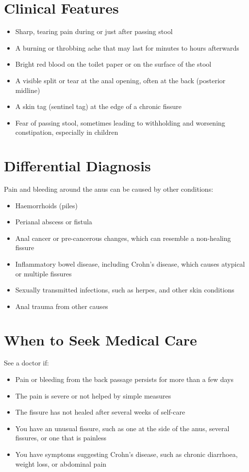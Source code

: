 \section*{Clinical Features}
\begin{itemize}
    \item Sharp, tearing pain during or just after passing stool
    \item A burning or throbbing ache that may last for minutes to hours afterwards
    \item Bright red blood on the toilet paper or on the surface of the stool
    \item A visible split or tear at the anal opening, often at the back (posterior midline)
    \item A skin tag (sentinel tag) at the edge of a chronic fissure
    \item Fear of passing stool, sometimes leading to withholding and worsening constipation, especially in children
\end{itemize}

\section*{Differential Diagnosis}
Pain and bleeding around the anus can be caused by other conditions:
\begin{itemize}
    \item Haemorrhoids (piles)
    \item Perianal abscess or fistula
    \item Anal cancer or pre-cancerous changes, which can resemble a non-healing fissure
    \item Inflammatory bowel disease, including Crohn's disease, which causes atypical or multiple fissures
    \item Sexually transmitted infections, such as herpes, and other skin conditions
    \item Anal trauma from other causes
\end{itemize}

\section*{When to Seek Medical Care}
See a doctor if:
\begin{itemize}
    \item Pain or bleeding from the back passage persists for more than a few days
    \item The pain is severe or not helped by simple measures
    \item The fissure has not healed after several weeks of self-care
    \item You have an unusual fissure, such as one at the side of the anus, several fissures, or one that is painless
    \item You have symptoms suggesting Crohn's disease, such as chronic diarrhoea, weight loss, or abdominal pain
\end{itemize}

